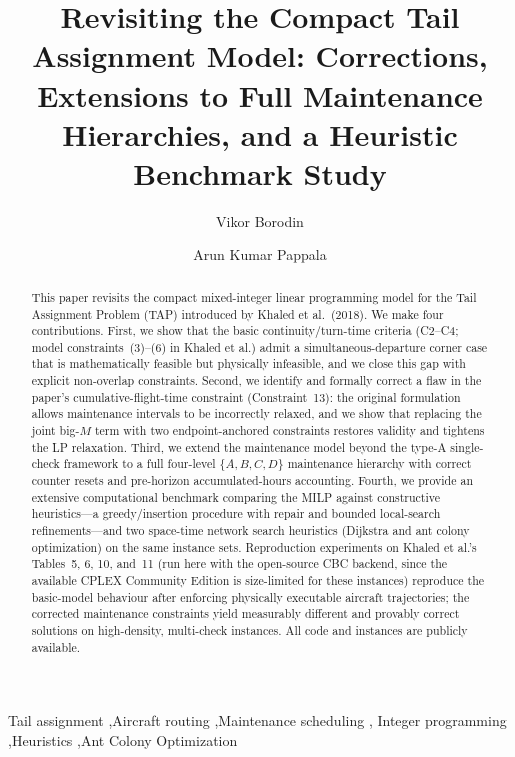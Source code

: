 \documentclass[review, 12pt, authoryear]{elsarticle}
\theoremstyle{plain}
\theoremstyle{definition}
\theoremstyle{remark}
\begin{document}
\begin{frontmatter}

\title{Revisiting the Compact Tail Assignment Model: Corrections,
  Extensions to Full Maintenance Hierarchies, and a Heuristic Benchmark Study}

\author[lgi]{Vikor Borodin}
\author[lip6]{Arun Kumar Pappala}

\address[lgi]{Taras Shevchenko National University, Kyiv, Ukraine}
\address[lip6]{Singapore University of Technology and Design, Singapore}

\begin{abstract}
This paper revisits the compact mixed-integer linear programming model for
the Tail Assignment Problem (TAP) introduced by Khaled et al.\ (2018).  We
make four contributions.  First, we show that the basic continuity/turn-time
criteria (C2--C4; model constraints~(3)--(6) in Khaled et al.) admit a
simultaneous-departure corner case that is mathematically feasible but
physically infeasible, and we close this gap with explicit non-overlap
constraints.  Second, we identify and formally correct a flaw in
the paper's cumulative-flight-time constraint (Constraint~13): the original
formulation allows maintenance intervals to be incorrectly relaxed, and we
show that replacing the joint big-$M$ term with two endpoint-anchored
constraints restores validity and tightens the LP relaxation.  Third, we
extend the maintenance model beyond the type-A single-check framework to a
full four-level $\{A, B, C, D\}$ maintenance hierarchy with correct counter
resets and pre-horizon accumulated-hours accounting.  Fourth, we provide an
extensive computational benchmark comparing the MILP against constructive
heuristics---a greedy/insertion procedure with repair and bounded local-search
refinements---and two space-time network search heuristics (Dijkstra and ant
colony optimization) on the same instance sets.  Reproduction experiments on
Khaled et al.'s Tables~5, 6, 10, and~11 (run here with the open-source CBC
backend, since the available CPLEX Community Edition is size-limited for these
instances) reproduce the basic-model behaviour after enforcing physically
executable aircraft trajectories; the corrected maintenance constraints yield measurably
different and provably correct solutions on high-density, multi-check
instances.  All code and instances are publicly available.
\end{abstract}

\begin{keyword}
Tail assignment \sep Aircraft routing \sep Maintenance scheduling \sep
Integer programming \sep Heuristics \sep Ant Colony Optimization
\end{keyword}

\end{frontmatter}
\end{document}

